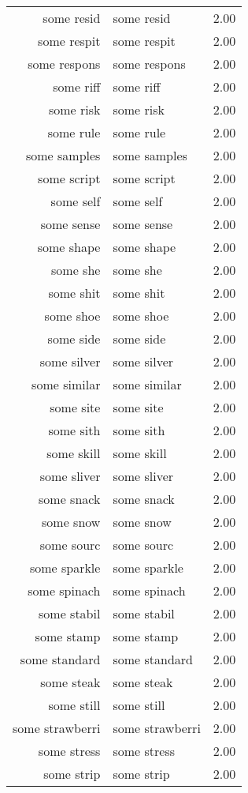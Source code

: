 \begin{table}[ht]
\begin{tabular}{rlr}
  some resid & some resid & 2.00 \\ 
  some respit & some respit & 2.00 \\ 
  some respons & some respons & 2.00 \\ 
  some riff & some riff & 2.00 \\ 
  some risk & some risk & 2.00 \\ 
  some rule & some rule & 2.00 \\ 
  some samples & some samples & 2.00 \\ 
  some script & some script & 2.00 \\ 
  some self & some self & 2.00 \\ 
  some sense & some sense & 2.00 \\ 
  some shape & some shape & 2.00 \\ 
  some she & some she & 2.00 \\ 
  some shit & some shit & 2.00 \\ 
  some shoe & some shoe & 2.00 \\ 
  some side & some side & 2.00 \\ 
  some silver & some silver & 2.00 \\ 
  some similar & some similar & 2.00 \\ 
  some site & some site & 2.00 \\ 
  some sith & some sith & 2.00 \\ 
  some skill & some skill & 2.00 \\ 
  some sliver & some sliver & 2.00 \\ 
  some snack & some snack & 2.00 \\ 
  some snow & some snow & 2.00 \\ 
  some sourc & some sourc & 2.00 \\ 
  some sparkle & some sparkle & 2.00 \\ 
  some spinach & some spinach & 2.00 \\ 
  some stabil & some stabil & 2.00 \\ 
  some stamp & some stamp & 2.00 \\ 
  some standard & some standard & 2.00 \\ 
  some steak & some steak & 2.00 \\ 
  some still & some still & 2.00 \\ 
  some strawberri & some strawberri & 2.00 \\ 
  some stress & some stress & 2.00 \\ 
  some strip & some strip & 2.00 \\ 

\end{tabular}
\end{table}
